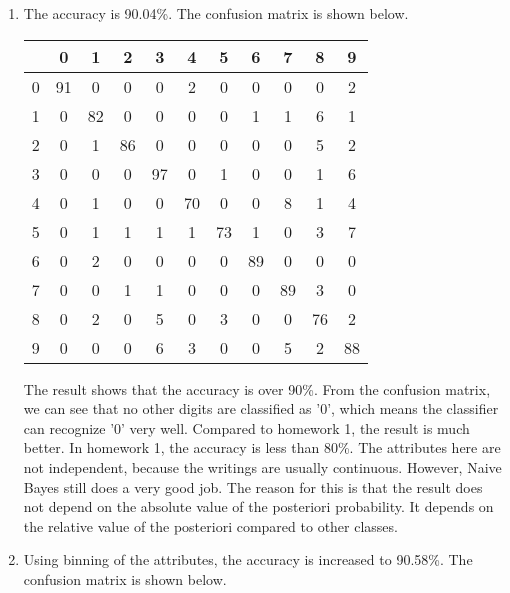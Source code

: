 \documentclass[11pt,letterpaper,oneside]{article}
\begin{document}
\begin{enumerate}
\begin{enumerate}
\begin{enumerate}
    \item The probability that a book with five stars and with ``Right" in its title is written by Democrat is shown below.

$P(Dem | FiveStar, ``Right") = P(FiveStar, ``Right")P(Dem, FiveStar, ``Right") = P(FiveStar | ``Right")P(``Right" | Dem) \times P(Dem)P(FiveStar | ``Right")P(``Right" | Dem) = 80\% \times 90\% \times 30\% \times 80\% \times 90\% = 15.552\%$
    \end{enumerate}

  \end{enumerate}

\item The accuracy is 90.04\%. The confusion matrix is shown below.

  \begin{tabular}{c|cccccccccc}
     & 0 & 1 & 2 & 3 & 4 & 5 & 6 & 7 & 8 & 9\\ \hline
   0 & 91&  0&  0&  0&  2&  0&  0&  0&  0&  2\\
   1 & 0& 82&  0&  0&  0&  0&  1&  1&  6&  1\\
   2 & 0&  1& 86&  0&  0&  0&  0&  0&  5&  2\\
   3 & 0&  0&  0& 97&  0&  1&  0&  0&  1&  6\\
   4 & 0&  1&  0&  0& 70&  0&  0&  8&  1&  4\\
   5 & 0&  1&  1&  1&  1& 73&  1&  0&  3&  7\\
   6 & 0&  2&  0&  0&  0&  0& 89&  0&  0&  0\\
   7 & 0&  0&  1&  1&  0&  0&  0& 89&  3&  0\\
   8 & 0&  2&  0&  5&  0&  3&  0&  0& 76&  2\\
   9 & 0&  0&  0&  6&  3&  0&  0&  5&  2& 88\\
  \end{tabular}

The result shows that the accuracy is over 90\%. From the confusion matrix, we can see that no other digits are classified as '0', which means the classifier can recognize '0' very well. Compared to homework 1, the result is much better. In homework 1, the accuracy is less than 80\%. The attributes here are not independent, because the writings are usually continuous. However, Naive Bayes still does a very good job. The reason for this is that the result does not depend on the absolute value of the posteriori probability. It depends on the relative value of the posteriori compared to other classes.

\item Using binning of the attributes, the accuracy is increased to 90.58\%. The confusion matrix is shown below.


\end{enumerate}
\end{document}
